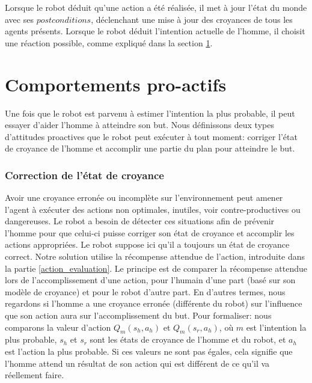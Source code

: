 \documentclass[a4paper,11pt,twoside]{StyleThese}
\begin{document}
Lorsque le robot déduit qu'une action a été réalisée, il met à jour l'état du monde avec ses $postconditions$, déclenchant une mise à jour des croyances de tous les agents présents. Lorsque le robot déduit l'intention actuelle de l'homme, il choisit une réaction possible, comme expliqué dans la section \ref{sec:robot_reaction}.



\section{Comportements pro-actifs}
\label{sec:robot_reaction}

Une fois que le robot est parvenu à estimer l'intention la plus probable, il peut essayer d'aider l'homme à atteindre son but. Nous définissons deux types d'attitudes proactives que le robot peut exécuter à tout moment: corriger l'état de croyance de l'homme et accomplir une partie du plan pour atteindre le but.

\subsubsection{Correction de l'état de croyance}
Avoir une croyance erronée ou incomplète sur l'environnement peut amener l'agent à exécuter des actions non optimales, inutiles, voir contre-productives ou dangereuses. Le robot a besoin de détecter ces situations afin de prévenir l'homme pour que celui-ci puisse corriger son état de croyance et accomplir les actions appropriées. Le robot suppose ici qu'il a toujours un état de croyance correct. Notre solution utilise la récompense attendue de l'action, introduite dans la partie \ref{action_evaluation}. Le principe est de comparer la récompense attendue lors de l'accomplissement d'une action, pour l'humain d'une part (basé sur son modèle de croyance) et pour le robot d'autre part. En d'autres termes, nous regardons si l'homme a une croyance erronée (différente du robot) sur l'influence que son action aura sur l'accomplissement du but. Pour formaliser: nous comparons la valeur d'action \(Q_m(s_h,a_h)\) et \(Q_m(s_r,a_h)\), où $m$ est l'intention la plus probable, $s_h$ et $s_r$ sont les états de croyance de l'homme et du robot, et $a_h$ est l'action la plus probable. Si ces valeurs ne sont pas égales, cela signifie que l'homme attend un résultat de son action qui est différent de ce qu'il va réellement faire.
\end{document}
